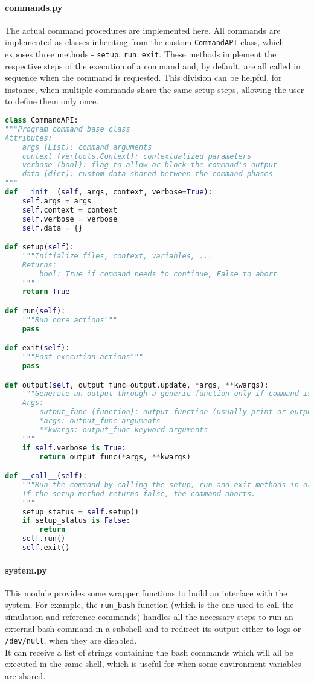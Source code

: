 \paragraph{commands.py} The actual command procedures are implemented here. All commands are implemented as classes inheriting from the custom \texttt{CommandAPI} class, which exposes three methods - \texttt{setup}, \texttt{run}, \texttt{exit}. These methods implement the respective steps of the execution of a command and, by default, are all called in sequence when the command is requested. This division can be helpful, for instance, when multiple commands share the same setup steps, allowing the user to define them only once.
\begin{lstlisting}[language=Python]
class CommandAPI:
"""Program command base class
Attributes:
    args (List): command arguments
    context (vertools.Context): contextualized parameters
    verbose (bool): flag to allow or block the command's output
    data (dict): custom data shared between the command phases
"""
def __init__(self, args, context, verbose=True):
    self.args = args
    self.context = context
    self.verbose = verbose
    self.data = {}

def setup(self):
    """Initialize files, context, variables, ...
    Returns:
        bool: True if command needs to continue, False to abort
    """
    return True

def run(self):
    """Run core actions"""
    pass

def exit(self):
    """Post execution actions"""
    pass

def output(self, output_func=output.update, *args, **kwargs):
    """Generate an output through a generic function only if command is set to verbose
    Args:
        output_func (function): output function (usually print or output.update)
        *args: output_func arguments
        **kwargs: output_func keyword arguments
    """
    if self.verbose is True:
        return output_func(*args, **kwargs)

def __call__(self):
    """Run the command by calling the setup, run and exit methods in order.
    If the setup method returns false, the command aborts.
    """
    setup_status = self.setup()
    if setup_status is False:
        return
    self.run()
    self.exit()
\end{lstlisting}

\paragraph{system.py} This module provides some wrapper functions to build an interface with the system. For example, the \texttt{run\_bash} function (which is the one used to call the simulation and reference commands) handles all the necessary steps to run an external bash command in a subshell and to redirect its output either to logs or \texttt{/dev/null}, when they are disabled.\\
It can receive a list of strings containing the bash commands which will all be executed in the same shell, which is useful for when some environment variables are shared.

